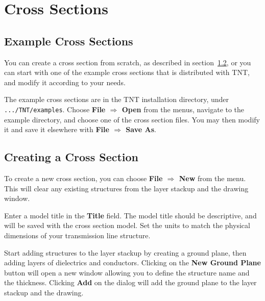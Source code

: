 \documentclass{article}
\begin{document}
\section {Cross Sections}



\subsection {Example Cross Sections} \label{sec:examples}

You can create a cross section from scratch, as described in
section~\ref{sec:create}, or you can start with one of the example
cross sections that is distributed with TNT, and modify it according
to your needs.

The example cross sections are in the TNT installation directory,
under {\tt .../TNT/examples}.  Choose {\bf File $\Rightarrow$ Open}
from the menus, navigate to the example directory, and choose one of
the cross section files.  You may then modify it and save it elsewhere
with {\bf File $\Rightarrow$ Save As}.





\subsection {Creating a Cross Section} \label{sec:create}

To create a new cross section, you can choose {\bf File $\Rightarrow$
New} from the menu.  This will clear any existing structures from the
layer stackup and the drawing window.

Enter a model title in the {\bf Title} field.  The model title should be
descriptive, and will be saved with the cross section model.  Set the
units to match the physical dimensions of your transmission line
structure.

Start adding structures to the layer stackup by creating a ground
plane, then adding layers of dielectrics and conductors.  Clicking on
the {\bf New Ground Plane} button will open a new window allowing you
to define the structure name and the thickness.  Clicking {\bf Add} on
the dialog will add the ground plane to the layer stackup and the
drawing.
\end{document}
